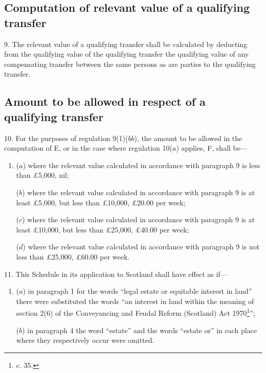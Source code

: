 \documentclass[12pt,a4paper]{article}
\begin{document}
\subsection*{Computation of relevant value of a qualifying transfer}

9.  The relevant value of a qualifying transfer shall be calculated by deducting from the qualifying value of the qualifying transfer the qualifying value of any compensating transfer between the same persons as are parties to the qualifying transfer.

\subsection*{Amount to be allowed in respect of a qualifying transfer}

10.  For the purposes of regulation 9(1)($bb$), the amount to be allowed in the computation of E, or in the case where regulation 10($a$) applies, F, shall be—
\begin{enumerate}\item[]
($a$) where the relevant value calculated in accordance with paragraph 9 is less than £5,000, nil;

($b$) where the relevant value calculated in accordance with paragraph 9 is at least £5,000, but less than £10,000, £20.00 per week;

($c$) where the relevant value calculated in accordance with paragraph 9 is at least £10,000, but less than £25,000, £40.00 per week;

($d$) where the relevant value calculated in accordance with paragraph 9 is not less than £25,000, £60.00 per week.
\end{enumerate}

\medskip

11.  This Schedule in its application to Scotland shall have effect as if—
\begin{enumerate}\item[]
($a$) in paragraph 1 for the words “legal estate or equitable interest in land” there were substituted the words “an interest in land within the meaning of section 2(6) of the Conveyancing and Feudal Reform (Scotland) Act 1970\footnote{ c. 35.}”;

($b$) in paragraph 4 the word “estate” and the words “estate or” in each place where they respectively occur were omitted.
\end{enumerate}

\end{document}
